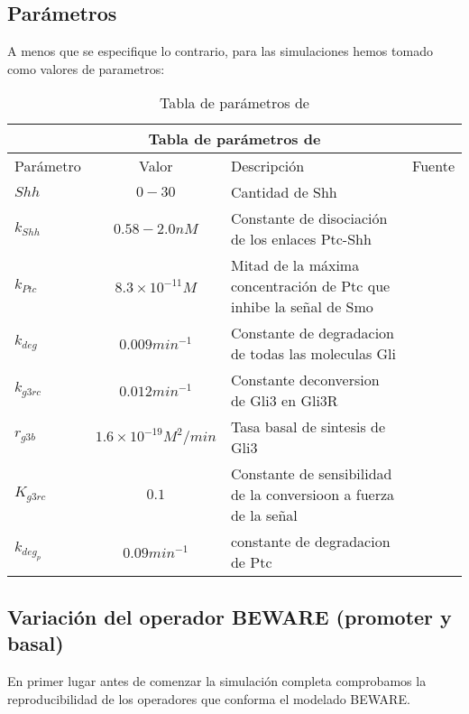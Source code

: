 \subsection{Parámetros}
A menos que se especifique lo contrario, para las simulaciones hemos tomado como valores de parametros:
\begin{table}[h]
	\begin{center}
		
		\begin{tabular}{ |p{3cm}||c|p{3cm}|p{3cm}|  }
			\hline
			\multicolumn{4}{|c|}{Tabla de parámetros de \cite{schaffer}  } \\
			\hline
			Parámetro & Valor & Descripción & Fuente\\
			\hline
			$Shh $  & $0-30$    &\tiny{Cantidad de Shh} &   \cite{cambon1}\\
			$k_{Shh}$ &  $ 0.58-2.0nM$  & \tiny{Constante de disociación de los enlaces Ptc-Shh}   & \cite{cambon1}\\
			$k_{Ptc} $ & $8.3\times10^{-11}M$ & \tiny{ Mitad de la máxima concentración de Ptc que inhibe la señal de Smo } &  \cite{cambon1}\\
			$k_{deg}$   &$0.009min^{-1} $ & \tiny{ Constante de degradacion de todas las moleculas Gli } &  \cite{cambon1}\\
			
			$k_{g3rc}$ &  $0.012min^{-1}$  & \tiny{ Constante deconversion de Gli3 en Gli3R} & \cite{schaffer}\\
			$r_{g3b}$ & $1.6\times10^{-19}M^2/min$  & \tiny{ Tasa basal de sintesis de Gli3 }   & \cite{schaffer}\\
			$K_{g3rc}$ & $0.1$ & \tiny{ Constante de sensibilidad de la conversioon a fuerza de la señal }   & \cite{schaffer}\\
			
			$k_{deg_p}$& $0.09min^{-1} $ &  \tiny{constante de degradacion de Ptc} & \cite{cambon1}\\
			
			\hline
		\end{tabular}
		
	\end{center}
	\caption{Tabla de parámetros de \cite{schaffer} }\label{param_2}
\end{table}

\subsection{Variación del operador BEWARE (promoter y basal)}
En primer lugar antes de comenzar la simulación completa comprobamos la reproducibilidad de los operadores que conforma el modelado BEWARE. 

